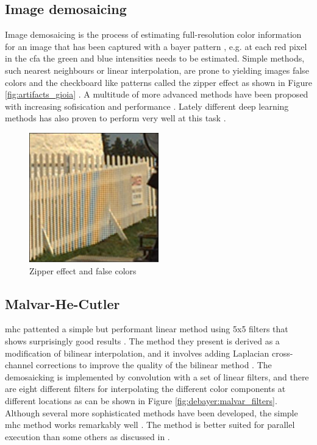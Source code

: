 \subsection{Image demosaicing}
Image demosaicing is the process of estimating full-resolution color information for an image that has been captured with a bayer pattern \cite{liImageDemosaicingSystematic2008}, e.g. at each red pixel in the \gls{cfa} the green and blue intensities needs to be estimated.
Simple methods, such nearest neighbours or linear interpolation, are prone to yielding images false colors and the checkboard like patterns called the zipper effect as shown in Figure \ref{fig:artifacts_gioia} \cite{gioiaDataDrivenConvolutionalModel2021} \cite{liImageDemosaicingSystematic2008}.
A multitude of more advanced methods have been proposed with increasing sofisication and performance \cite{liImageDemosaicingSystematic2008}.
Lately different deep learning methods has also proven to perform very well at this task \cite{kwanComparisonDeepLearning2019}.

\begin{figure}[H]
    \centering
    \includegraphics[width=0.5\textwidth]{figures/debayer/artifacts_gioia.png}
    \caption{Zipper effect and false colors \cite{gioiaDataDrivenConvolutionalModel2021}}
    \label{fig:artifacts_gioioa}
\end{figure}

\subsection{Malvar-He-Cutler}
\gls{mhc} pattented a simple but performant linear method using 5x5 filters that shows surprisingly good results \cite{malvarHighqualityGradientcorrectedLinear2009}.
The method they present is derived as a modification of bilinear interpolation, and it involves adding Laplacian cross-channel corrections to improve the quality of the bilinear method \cite{getreuerMalvarHeCutlerLinearImage2011}.
The demosaicking is implemented by convolution with a set of linear filters, and there are eight different filters for interpolating the different color components at different locations as can be shown in Figure \ref{fig:debayer:malvar_filters}.
Although several more sophisticated methods have been developed, the simple \gls{mhc} method works remarkably well \cite{liImageDemosaicingSystematic2008}\cite{kwanComparisonDeepLearning2019}\cite{getreuerMalvarHeCutlerLinearImage2011}.
The method is better suited for parallel execution than some others as discussed in \todo.


